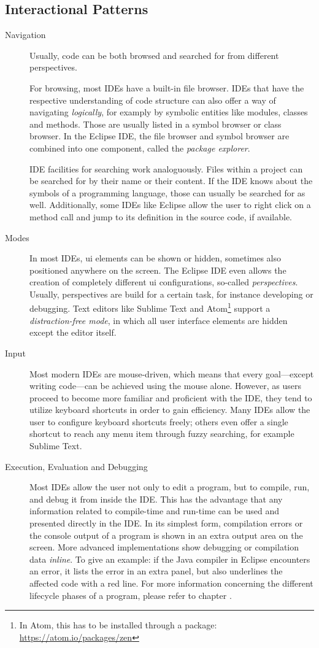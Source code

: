 \subsection{Interactional Patterns}\label{interactional-patterns}

\begin{description}
\item[Navigation]
Usually, code can be both browsed and searched for from different
perspectives.

For browsing, most IDEs have a built-in file browser. IDEs that have the
respective understanding of code structure can also offer a way of
navigating \emph{logically}, for examply by symbolic entities like
modules, classes and methods. Those are usually listed in a symbol
browser or class browser. In the Eclipse IDE, the file browser and
symbol browser are combined into one component, called the \emph{package
explorer}.

IDE facilities for searching work analoguously. Files within a project
can be searched for by their name or their content. If the IDE knows
about the symbols of a programming language, those can usually be
searched for as well. Additionally, some IDEs like Eclipse allow the
user to right click on a method call and jump to its definition in the
source code, if available.
\item[Modes]
In most IDEs, \ac{ui} elements can be shown or hidden, sometimes also
positioned anywhere on the screen. The Eclipse IDE even allows the
creation of completely different \ac{ui} configurations, so-called
\emph{perspectives}. Usually, perspectives are build for a certain task,
for instance developing or debugging. Text editors like Sublime Text and
Atom\footnote{In Atom, this has to be installed through a package: \url{https://atom.io/packages/zen}}
support a \emph{distraction-free mode}, in which all user interface
elements are hidden except the editor itself.
\item[Input]
Most modern IDEs are mouse-driven, which means that every goal—except
writing code—can be achieved using the mouse alone. However, as users
proceed to become more familiar and proficient with the IDE, they tend
to utilize keyboard shortcuts in order to gain efficiency. Many IDEs
allow the user to configure keyboard shortcuts freely; others even offer
a single shortcut to reach any menu item through fuzzy searching, for
example Sublime Text.
\item[Execution, Evaluation and Debugging]
Most IDEs allow the user not only to edit a program, but to compile,
run, and debug it from inside the IDE. This has the advantage that any
information related to compile-time and run-time can be used and
presented directly in the IDE. In its simplest form, compilation errors
or the console output of a program is shown in an extra output area on
the screen. More advanced implementations show debugging or compilation
data \emph{inline}. To give an example: if the Java compiler in Eclipse
encounters an error, it lists the error in an extra panel, but also
underlines the affected code with a red line. For more information
concerning the different lifecycle phases of a program, please refer to
chapter .
\end{description}

